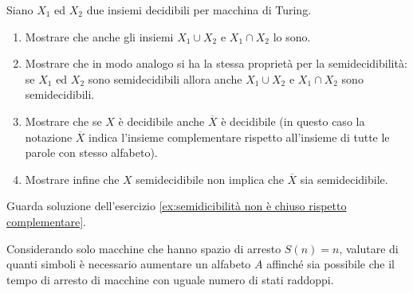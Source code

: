 \newpage

\begin{ex}
Siano $X_1$ ed $X_2$ due insiemi decidibili per macchina di Turing.
\begin{enumerate}
    \item Mostrare che anche gli insiemi $X_1\cup X_2$ e $X_1\cap X_2$ lo sono.
    \item Mostrare che in modo analogo si ha la stessa proprietà per la semidecidibilità: se $X_1$ ed $X_2$ sono semidecidibili allora anche $X_1\cup X_2$ e $X_1\cap X_2$ sono semidecidibili.
    \item Mostrare che se $X$ è decidibile anche $\overline{X}$ è decidibile (in questo caso la notazione $\overline{X}$ indica l'insieme complementare rispetto all'insieme di tutte le parole con stesso alfabeto).
    \item Mostrare infine che $X$ semidecidibile non implica che $\overline{X}$ sia semidecidibile.
\end{enumerate}
\end{ex}

\begin{sol}
    Guarda soluzione dell'esercizio \ref{ex:semidicibilità non è chiuso rispetto complementare}.
\end{sol}

\newpage


\begin{ex}
Considerando solo macchine che hanno spazio di arresto $S(n)=n$, valutare di quanti simboli è necessario aumentare un alfabeto $A$ affinché sia possibile che il tempo di arresto di macchine con uguale numero di stati raddoppi.
\end{ex}


